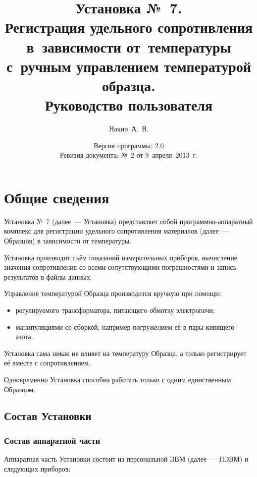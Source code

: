 \documentclass[12pt, a4paper, twocolumn]{report}
\title{Установка №~7. \\ Регистрация удельного сопротивления в~зависимости от~температуры с~ручным управлением температурой образца. \\ Руководство пользователя}
\author{Накин~А.~В.}
\date{Версия программы: 2.0\\Ревизия документа: №~2 от \mbox{9 апреля 2013~г.}}
\begin{document}
\maketitle

\tableofcontents

\chapter{Общие сведения}

Установка №~7 (далее~--- Установка) представляет собой программно-аппаратный комплекс для регистрации удельного сопротивления материалов (далее~--- Образцов) в зависимости от температуры.

Установка производит съём показаний измерительных приборов, вычисление значения сопротивления со всеми сопутствующими погрешностями и запись результатов в файлы данных.

Управление температурой Образца производится вручную при помощи:

\begin{itemize}
\item регулируемого трансформатора, питающего обмотку электропечи;
\item манипуляциями со сборкой, например погружением её в пары кипящего азота.
\end{itemize}

Установка сама никак не влияет на температуру Образца, а только регистрирует её вместе с сопротивлением.

Одновременно Установка способна работать только с одним единственным Образцом.

\section{Состав Установки}

\subsection{Состав аппаратной части}

Аппаратная часть Установки состоит из персональной ЭВМ (далее~--- ПЭВМ) и следующих приборов:
\end{document}

